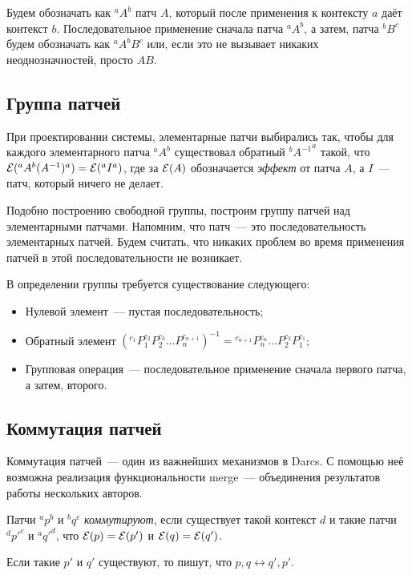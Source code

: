 \begin{notation}
  Будем обозначать как ${}^aA^b$ патч $A$, который после применения к
  контексту $a$ даёт контекст $b$. Последовательное применение сначала
  патча ${}^aA^b$, а затем, патча ${}^bB^c$ будем обозначать как
  ${}^aA^bB^c$ или, если это не вызывает никаких неоднозначностей,
  просто $AB$. 
\end{notation}

\subsection{Группа патчей}

При проектировании системы, элементарные патчи выбирались так, чтобы
для каждого элементарного патча ${}^aA^b$ существовал обратный
${}^b{A^{-1}}^a$ такой, что ${\cal E}({}^aA^b(A^{-1})^a) = {\cal
  E}({}^aI^a)$, где за ${\cal E}(A)$ обозначается \emph{эффект} от
патча $A$, а $I$~--- патч, который ничего не делает.

Подобно построению свободной группы, построим группу патчей над
элементарными патчами. Напомним, что патч~--- это последовательность
элементарных патчей. Будем считать, что никаких проблем во время
применения патчей в этой последовательности не возникает.

\begin{definition}
  В определении группы требуется существование следующего:

  \begin{itemize}
  \item Нулевой элемент~--- пустая последовательность;
  \item Обратный элемент
    $({}^{c_1}P_1^{c_2}P_2^{c_3}\ldots P_n^{c_{n+1}})^{-1} =
    {}^{c_{n+1}}P_n^{c_n}\ldots P_2^{c_2}P_1^{c_1}$;
  \item Групповая операция~--- последовательное применение сначала
    первого патча, а затем, второго.
  \end{itemize}
\end{definition}

\subsection{Коммутация патчей}

Коммутация патчей~--- один из важнейших механизмов в Darcs. С помощью
неё возможна реализация функциональности merge~--- объединения
результатов работы нескольких авторов.

\begin{definition}
  Патчи ${}^ap^b$ и ${}^bq^c$ \emph{коммутируют}, если существует
  такой контекст $d$ и такие патчи ${}^d{p'}^c$ и ${}^a{q'}^d$, что
  ${\cal E}(p) = {\cal E}(p')$ и ${\cal E}(q) = {\cal E}(q')$.

  Если такие $p'$ и $q'$ существуют, то пишут, что $p, q
  \longleftrightarrow q', p'$.
\end{definition}

